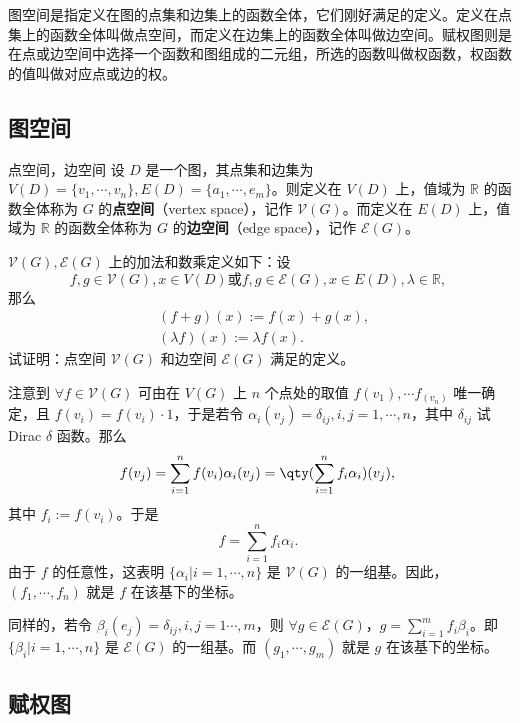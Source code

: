 
图空间是指定义在图的点集和边集上的函数全体，它们刚好满足的定义。定义在点集上的函数全体叫做点空间，而定义在边集上的函数全体叫做边空间。赋权图则是在点或边空间中选择一个函数和图组成的二元组，所选的函数叫做权函数，权函数的值叫做对应点或边的权。

\subsection{图空间}
\begin{definition}{点空间，边空间}
设 $D$ 是一个图，其点集和边集为 $V(D)=\{v_1,\cdots,v_n\},E(D)=\{a_1,\cdots,e_m\}$。则定义在 $V(D)$ 上，值域为 $\mathbb R$ 的函数全体称为 $G$ 的\textbf{点空间}（vertex space），记作 $\mathcal V(G)$。而定义在 $E(D)$ 上，值域为 $\mathbb R$ 的函数全体称为 $G$ 的\textbf{边空间}（edge space），记作 $\mathcal E(G)$。
\end{definition}


\begin{exercise}{}
 $\mathcal V(G),\mathcal E(G)$ 上的加法和数乘定义如下：设
\begin{equation}
f,g\in\mathcal V(G),x\in V(D)\text{或} f,g\in\mathcal E(G),x\in E(D),\lambda\in \mathbb R,~
\end{equation}
那么
\begin{equation}
\begin{aligned}
&(f+g)(x):=f(x)+g(x),\\
&(\lambda f)(x):=\lambda f(x).
\end{aligned}~
\end{equation}
试证明：点空间 $\mathcal V(G)$ 和边空间 $\mathcal E(G)$ 满足的定义。
\end{exercise}

注意到 $\forall f\in\mathcal V(G)$ 可由在 $V(G)$ 上 $n$ 个点处的取值 $f(v_1),\cdots f_(v_n)$ 唯一确定，且 $f(v_i)=f(v_i)\cdot 1$，于是若令 $\alpha_i(v_j)=\delta_{ij},i,j=1,\cdots,n$，其中 $\delta_{ij}$ 试Dirac $\delta$ 函数。那么
\begin{equation}
f(v_j)=\sum_{i=1}^n f(v_i)\alpha_i(v_j)=\qty(\sum_{i=1}^n f_i\alpha_i)(v_j),~
\end{equation}
其中 $f_i:=f(v_i)$。于是
\begin{equation}
f=\sum_{i=1}^n f_i\alpha_i.~
\end{equation}
由于 $f$ 的任意性，这表明 $\{\alpha_i|i=1,\cdots,n\}$ 是 $\mathcal V(G)$ 的一组基。因此，$(f_1,\cdots,f_n)$ 就是 $f$ 在该基下的坐标。

同样的，若令 $\beta_i(e_j)=\delta_{ij},i,j=1\cdots,m$，则 $\forall g\in\mathcal E(G)$，$g=\sum\limits_{i=1}^m f_i\beta_i$。即 $\{\beta_i|i=1,\cdots,n\}$ 是 $\mathcal E(G)$ 的一组基。而 $(g_1,\cdots,g_m)$ 就是 $g$ 在该基下的坐标。

\subsection{赋权图}












